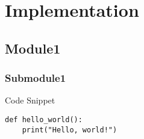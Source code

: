 \chapter{Implementation}

\section{Module1}

\subsection{Submodule1}
Code Snippet
\begin{lstlisting}[caption=Example of inline Python code, label=lst:inline-code]
def hello_world():
    print("Hello, world!")
\end{lstlisting}